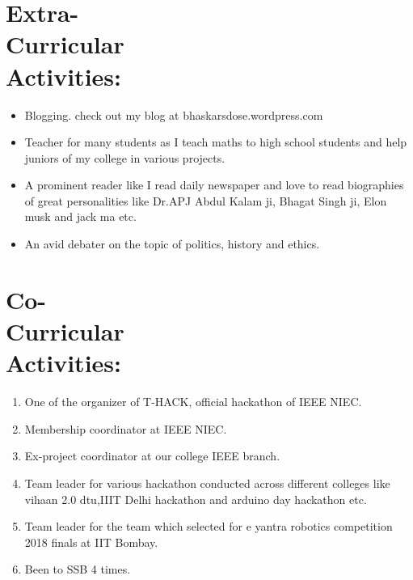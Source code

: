 \documentclass[10pt]{report}
\begin{document}
\section*{Extra-\\Curricular\\Activities:} %
\begin{itemize}
	\item Blogging. check out my blog at bhaskarsdose.wordpress.com
	\item Teacher for many students as I teach maths to high school students and help juniors of my college in various projects.
	\item A prominent reader like I read daily newspaper and love to read biographies of great personalities like Dr.APJ Abdul Kalam ji, Bhagat Singh ji, Elon musk and jack ma etc.
	\item An avid debater on the topic of politics, history and ethics.
\end{itemize}

\section*{Co-\\Curricular\\Activities:}%
\begin{enumerate}
	\item One of the organizer of T-HACK, official hackathon of IEEE NIEC.
	\item Membership coordinator at IEEE NIEC.
	\item Ex-project coordinator at our college IEEE branch. 
	\item Team leader for various hackathon conducted across different colleges like vihaan 2.0 dtu,IIIT Delhi hackathon and arduino day hackathon etc.
	\item Team leader for the team which selected for e yantra robotics competition 2018 finals at IIT Bombay.
	\item Been to SSB 4 times.
\end{enumerate}
\end{document}
